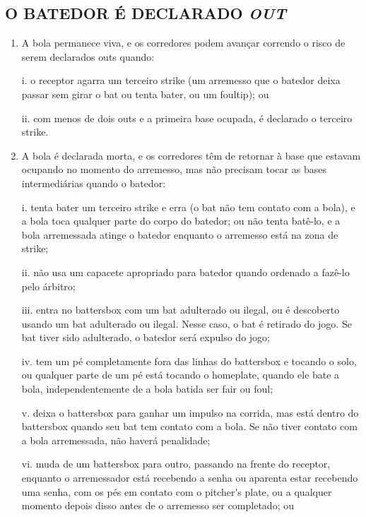 \subsection{O BATEDOR É DECLARADO \textit{OUT}}
\begin{enumerate}[label=(\alph*)]
	\item   A bola permanece viva, e os corredores podem avançar correndo o risco de serem declarados \gls{out}s quando:

	i. o receptor agarra um terceiro \gls{strike} (um arremesso que o batedor deixa passar sem girar o \gls{bat} ou tenta bater, ou um \gls{foultip}); ou

	ii. com menos de dois \glspl{out} e a primeira base ocupada, é declarado o terceiro \gls{strike}.

	\item  A bola é declarada morta, e os corredores têm de retornar à base que estavam ocupando no momento do arremesso, mas não precisam tocar as bases intermediárias quando o batedor:

	i. tenta bater um terceiro \gls{strike} e erra (o \gls{bat} não tem contato com a bola), e a bola toca qualquer parte do corpo do batedor; ou não tenta batê-lo, e a bola arremessada atinge o batedor enquanto o arremesso está na zona de \gls{strike};

	ii. não usa um capacete apropriado para batedor quando ordenado a fazê-lo pelo árbitro;

	iii. entra no \gls{battersbox} com um \gls{bat} adulterado ou ilegal, ou é descoberto usando um \gls{bat} adulterado ou ilegal. Nesse caso, o \gls{bat} é retirado do jogo. Se \gls{bat} tiver sido adulterado, o batedor será expulso do jogo;

	iv. tem um pé completamente fora das linhas do \gls{battersbox} e tocando o solo, ou qualquer parte de um pé está tocando o \gls{homeplate}, quando ele bate a bola, independentemente de a bola batida ser \gls{fair} ou \gls{foul};

	v. deixa o \gls{battersbox} para ganhar um impulso na corrida, mas está dentro do \gls{battersbox} quando seu \gls{bat} tem contato com a bola. Se não tiver contato com a bola arremessada, não haverá penalidade;

	vi. muda de um \gls{battersbox} para outro, passando na frente do receptor, enquanto o arremessador está recebendo a senha ou aparenta estar recebendo uma senha, com os pés em contato com o \gls{pitcher's plate}, ou a qualquer momento depois disso antes de o arremesso ser completado; ou


\end{enumerate}
